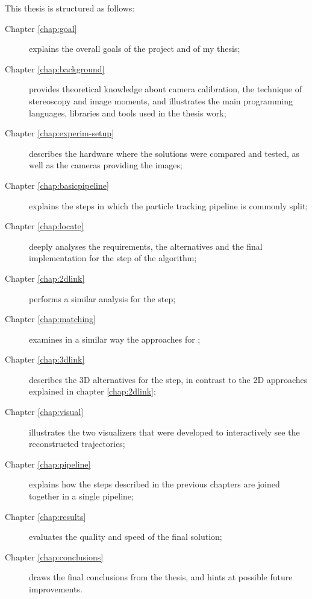 

\newcommand{\structuretype}{description}
\newcommand{\structureitem}[2]{\item[Chapter #1] #2}

This thesis is structured as follows:

\begin{\structuretype}
	\structureitem{\ref{chap:goal}}{explains the overall goals of the project and of my thesis;}
	\structureitem{\ref{chap:background}}{provides theoretical knowledge about camera calibration, the technique of stereoscopy and image moments, and illustrates the main programming languages, libraries and tools used in the thesis work;}
	\structureitem{\ref{chap:experim-setup}}{describes the hardware where the solutions were compared and tested, as well as the cameras providing the images;}
	\structureitem{\ref{chap:basicpipeline}}{explains the steps in which the particle tracking pipeline is commonly split;}
	\structureitem{\ref{chap:locate}}{deeply analyses the requirements, the alternatives and the final implementation for the \locate* step of the algorithm;}
	\structureitem{\ref{chap:2dlink}}{performs a similar analysis for the \linkDD* step;}
	\structureitem{\ref{chap:matching}}{examines in a similar way the approaches for \match*;}
	\structureitem{\ref{chap:3dlink}}{describes the 3D alternatives for the \link* step, in contrast to the 2D approaches explained in chapter \ref{chap:2dlink};}
	\structureitem{\ref{chap:visual}}{illustrates the two visualizers that were developed to interactively see the reconstructed trajectories;}
	\structureitem{\ref{chap:pipeline}}{explains how the steps described in the previous chapters are joined together in a single pipeline;}
	\structureitem{\ref{chap:results}}{evaluates the quality and speed of the final solution;}
	\structureitem{\ref{chap:conclusions}}{draws the final conclusions from the thesis, and hints at possible future improvements.}
\end{\structuretype}

